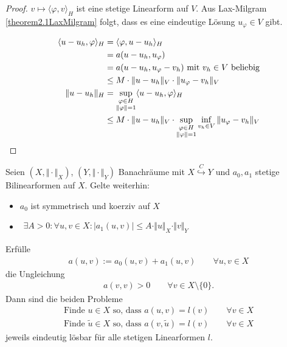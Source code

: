 \begin{proof}
$v\mapsto\langle\varphi,v\rangle_H$ ist eine stetige Linearform auf $V$. Aus Lax-Milgram \ref{theorem2.1LaxMilgram} folgt, dass es eine eindeutige Lösung $u_\varphi\in V$ gibt.
 
\begin{align*}
\langle u-u_h,\varphi\rangle_H
&=\langle\varphi,u-u_h\rangle_H\\
&=a(u-u_h,u_\varphi)\\
&=a(u-u_h,u_\varphi-v_h)\mit v_h\in V\text{ beliebig}\\
&\leq M\cdot\Vert u-u_h\Vert_V\cdot\Vert u_\varphi-v_h\Vert_V\\
\Vert u-u_h\Vert_H
&=\sup\limits_{\begin{subarray}{c}\varphi\in H\\\Vert\varphi\Vert=1\end{subarray}}\langle u-u_h,\varphi\rangle_H\\
&\leq M\cdot\Vert u-u_h\Vert_V\cdot\sup\limits_{\begin{subarray}{c}\varphi\in H\\\Vert\varphi\Vert=1\end{subarray}}\inf\limits_{v_h\in V}\Vert u_\varphi-v_h\Vert_V
\end{align*}
\end{proof}

\begin{theorem}\label{theorem2.4} %
Seien $(X,\Vert\cdot\Vert_X)$, $(Y,\Vert\cdot\Vert_Y)$ Banachräume  mit $X\stackrel{C}{\hookrightarrow} Y$ und $a_0,a_1$ stetige Bilinearformen auf $X$. Gelte weiterhin:
\begin{itemize}
\item $a_0$ ist symmetrisch und koerziv auf $X$
\item $\begin{aligned}
\exists A>0:\forall u,v\in X:\big|a_1(u,v)\big|\leq A\cdot\Vert u\Vert_X\cdot\Vert v\Vert_Y
\end{aligned}$
\end{itemize}
Erfülle
\begin{align*}
a(u,v):=a_0(u,v)+a_1(u,v)\qquad\forall u,v\in X
\end{align*}
die Ungleichung
\begin{align*}
a(v,v)>0\qquad\forall v\in X\setminus\lbrace0\rbrace.
\end{align*}
Dann sind die beiden Probleme
\begin{align*}
\text{Finde }u\in X\text{ so, dass }
a(u,v)=l(v)\qquad\forall v\in X\\
\text{Finde }\tilde{u}\in X\text{ so, dass }
a(v,\tilde{u})=l(v)\qquad\forall v\in X
\end{align*}
jeweils eindeutig lösbar für alle stetigen Linearformen $l$.
\end{theorem}

